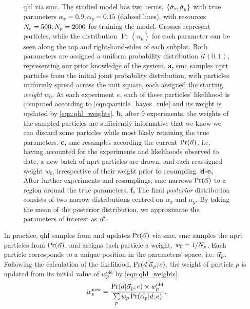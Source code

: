 \begin{figure}
{    }
    \hspace{0mm}
    \caption[Quantum Hamiltonian learning via sequential Monte Carlo]{
        \Acrfull{qhl} via \gls{smc}. 
        The studied model has two terms, $\{\hat{\sigma}_{x}, \hat{\sigma}_{y}\}$ with true parameters $\alpha_{x}=0.9, \alpha_y=0.15$ (dahsed lines), 
            with resources $N_e=500, N_p=2000$ for training the model. 
        Crosses represent \glspl{particle}, while the distribution $\Pr(\alpha_p)$ for each 
            parameter can be seen along the top and right-hand-sides of each subplot. 
        Both parameters are assigned a uniform probability distribution $\mathcal{U}(0,1)$, representing our prior knowledge of the system. 
        \textbf{a,} \gls{smc} samples \gls{nprt} \glspl{particle} from the initial joint probability distribution, 
            with \glspl{particle} uniformly spread across the unit square, each assigned the starting \emph{weight} $w_0$. 
            At each \gls{experiment} $e$, each of these \glspl{particle}' \gls{likelihood} is computed according to \cref{eqn:particle_bayes_rule}
            and its weight is updated by \cref{eqn:qhl_weights}.
        \textbf{b,} after 9 \glspl{experiment}, the weights of the sampled \glspl{particle} are sufficiently informative that we know we can 
            discard some \glspl{particle} while most likely retaining the true parameters. 
        \textbf{c,} \gls{smc} resamples according the current $\Pr(\vec{\alpha})$, 
            i.e. having accounted for the \glspl{experiment} and \glspl{likelihood}  observed to date, 
            a new batch of \gls{nprt} \glspl{particle} are drawn, and each reassigned weight $w_0$, 
            irrespective of their weight prior to resampling.  
        \textbf{d-e,} After further \glspl{experiment} and resamplings, \gls{smc} narrows $\Pr(\vec{\alpha})$ to a region around the true parameters. 
        \textbf{f,} The final \emph{posterior} distribution consists of two narrow distributions centred on $\alpha_x$ and $\alpha_y$. 
        By taking the mean of the posterior distribution, we approximate the parameters of interest as $\vec{\alpha}^{\prime}$. 
    }
    \label{fig:qhl_smc}
\end{figure}
In practice, \gls{qhl} samples from and updates $\Pr(\vec{\alpha})$  via \gls{smc}.
\gls{smc} samples the \gls{nprt} \glspl{particle} from $\Pr(\vec{\alpha})$, and assigns each \gls{particle} a weight, $w_0 = 1/N_p$.
Each \gls{particle} corresponds to a unique position in the parameters' space, i.e. $\vec{\alpha}_p$.
Following the calculation of the likelihood, $\Pr(d | \vec{\alpha}_p; e)$, 
    the weight of \gls{particle} $p$ is updated from its initial value of $w_p^{\textrm{old}}$ by \cref{eqn:qhl_weights}.
\begin{equation}\label{eqn:qhl_weights}
    w_p^{\textrm{new}} = \frac{\Pr(d | \vec{\alpha}_p; e) \times w_p^{\textrm{old}} } { \sum\limits_{p} w_p \Pr(\vec{\alpha}_p | d; e) }.
\end{equation}


